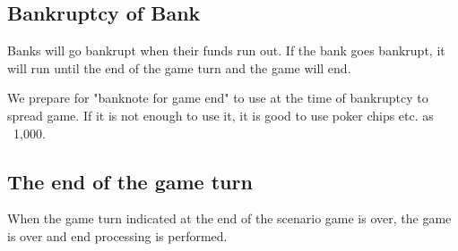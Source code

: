 \documentclass{article}
\begin{document}
\begin{CJK}{UTF8}{min}
\subsection{Bankruptcy of Bank}

Banks will go bankrupt when their funds run out. If the bank goes
bankrupt, it will run until the end of the game turn and the game will
end.

We prepare for "banknote for game end" to use at the time of
bankruptcy to spread game. If it is not enough to use it, it is good
to use poker chips etc. as \ 1,000.

\subsection{The end of the game turn}

When the game turn indicated at the end of the scenario game is over,
the game is over and end processing is performed.
















\end{CJK}
\end{document}
